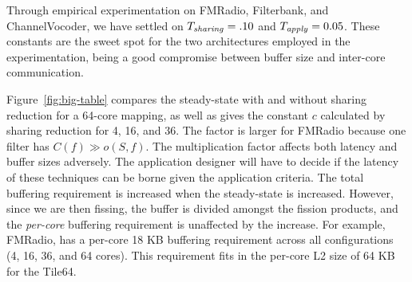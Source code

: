 Through empirical experimentation on FMRadio, Filterbank, and
ChannelVocoder, we have settled on $T_{\relax{\it sharing}} =.10$ and
$T_{\relax{\it apply}} = 0.05$. These constants are the sweet spot for the two
architectures employed in the experimentation, being a good compromise
between buffer size and inter-core communication.






Figure~\ref{fig:big-table} compares the steady-state with and
without sharing reduction for a 64-core mapping, as well as gives the
constant $c$ calculated by sharing reduction for 4, 16, and 36.  The
factor is larger for FMRadio because one filter has $C(f) \gg o(S,
f)$.  The multiplication factor affects both latency and buffer sizes
adversely.  The application designer will have to decide if the
latency of these techniques can be borne given the application
criteria.  The total buffering requirement is increased when the
steady-state is increased.  However, since we are then fissing, the
buffer is divided amongst the fission products, and the {\it per-core}
buffering requirement is unaffected by the increase.  For example,
FMRadio, has a per-core 18 KB buffering requirement across all
configurations (4, 16, 36, and 64 cores).  This requirement fits in
the per-core L2 size of 64 KB for the Tile64.

